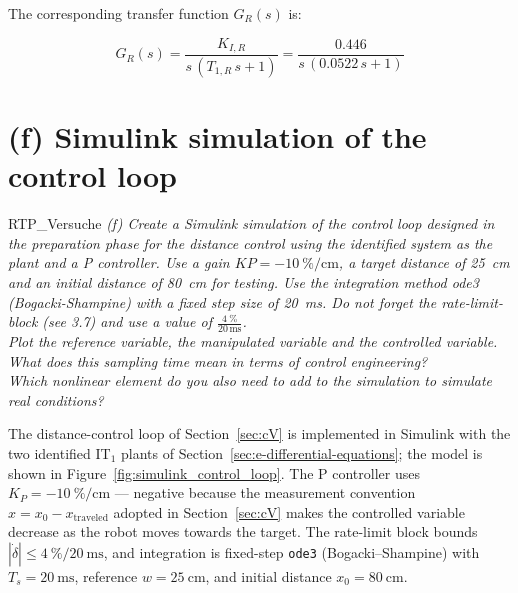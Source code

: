 \documentclass[12pt, oneside, a4paper]{scrreprt}
\begin{document}
            The corresponding transfer function $G_R(s)$ is:

            \begin{equation}
                G_R(s) = \frac{K_{I,R}}{s\,(T_{1,R}\,s + 1)} = \frac{0.446}{s\,(0.0522\,s + 1)}
            \end{equation}




            \cleardoubleemptypage

        \section{(f) Simulink simulation of the control loop}\label{sec:f-simulink-simulation}


            \begin{displaycquote}{RTP_Versuche}
                \footnotesize{\textit{(f) Create a Simulink simulation of the control loop designed in the preparation phase for the distance control using the identified system as the plant and a P controller. Use a gain $KP = \qty{-10}{\percent\per\cm}$, a target distance of \qty{25}{\cm} and an initial distance of \qty{80}{\cm} for testing. Use the integration method ode3 (Bogacki-Shampine) with a fixed step size of \qty{20}{\ms}. Do not forget the rate-limit-block (see 3.7) and use a value of $\frac{\qty{4}{\percent}}{20\,\text{ms}}$.
                \vspace{2mm}\\
                Plot the reference variable, the manipulated variable and the controlled variable.
                \vspace{2mm}\\
                What does this sampling time mean in terms of control engineering?\\
                Which nonlinear element do you also need to add to the simulation to simulate real conditions?}}
            \end{displaycquote}\label{task(f)}

            The distance-control loop of Section~\ref{sec:cV} is implemented in Simulink with the two identified IT$_1$ plants of Section~\ref{sec:e-differential-equations}; the model is shown in Figure~\ref{fig:simulink_control_loop}. The P controller uses $K_P = \qty{-10}{\percent\per\centi\metre}$ --- negative because the measurement convention $x = x_0 - x_\text{traveled}$ adopted in Section~\ref{sec:cV} makes the controlled variable decrease as the robot moves towards the target. The rate-limit block bounds $|\dot{\delta}| \le \qty{4}{\percent}/\qty{20}{\milli\second}$, and integration is fixed-step \texttt{ode3} (Bogacki--Shampine) with $T_s = \qty{20}{\milli\second}$, reference $w = \qty{25}{\centi\metre}$, and initial distance $x_0 = \qty{80}{\centi\metre}$.
\end{document}
